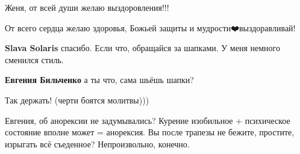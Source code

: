 \begin{itemize}
Женя, от всей души желаю выздоровления!!!

 
От всего сердца желаю здоровья, Божьей защиты и мудрости❤️выздоравливай!

\begin{itemize}
 
\textbf{Slava Solaris} спасибо. Если что, обращайся за шапками. У меня немного сменился стиль.

 
\textbf{Евгения Бильченко} а ты что, сама шьёшь шапки?
\end{itemize}

 
Так держать!
(черти боятся молитвы)))

 

Евгения, об анорексии не задумывались? Курение изобильное + психическое
состояние вполне может = анорексия. Вы после трапезы не бежите, простите,
изрыгать всё съеденное? Непроизвольно, конечно.

\begin{itemize}
 

\end{itemize}
\end{itemize}
